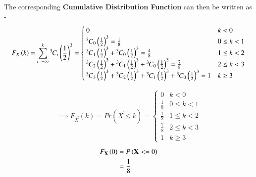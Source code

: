 \documentclass[journal]{IEEEtran}
\begin{document}
The corresponding \textbf{Cumulative Distribution Function} can then be written as - 
\begin{align}
  F_{X}\left(k\right) = \sum_{i = -\infty}^k{{}^{3}\mkern-1muC_{i}}\left(\frac{1}{2}\right)^3 = \begin{cases}
    0 & k < 0\\
    {{}^{3}\mkern-1muC_{0}}\left(\frac{1}{2}\right)^3 = \frac{1}{8} & 0 \le k < 1\\
    {{}^{3}\mkern-1muC_{1}}\left(\frac{1}{2}\right)^3 + {{}^{3}\mkern-1muC_{0}}\left(\frac{1}{2}\right)^3 = \frac{4}{8}& 1 \le k < 2\\
    {{}^{3}\mkern-1muC_{2}}\left(\frac{1}{2}\right)^3 + {{}^{3}\mkern-1muC_{1}}\left(\frac{1}{2}\right)^3 + {{}^{3}\mkern-1muC_{0}}\left(\frac{1}{2}\right)^3 = \frac{7}{8} & 2 \le k < 3\\
    {{}^{3}\mkern-1muC_{3}}\left(\frac{1}{2}\right)^3 + {{}^{3}\mkern-1muC_{2}}\left(\frac{1}{2}\right)^3 + {{}^{3}\mkern-1muC_{1}}\left(\frac{1}{2}\right)^3 + {{}^{3}\mkern-1muC_{0}}\left(\frac{1}{2}\right)^3= 1 & k \geq 3\\
  \end{cases}
\end{align}


\begin{align}
\implies F_{\vec{X}}(k) = Pr(\vec{X} \leq k) =
\begin{cases}
    0 & k < 0 \\
    \frac{1}{8} & 0 \leq k < 1 \\
    \frac{1}{2} & 1 \leq k < 2 \\
    \frac{7}{8} & 2 \leq k < 3 \\
    1 & k \geq 3
\end{cases}
\end{align}
\begin{align}
	F_{\mathbf{X}} \left(0\right) &= P \left( \mathbf{X} <= 0 \right) \\
	                     &= \frac{1}{8}
\end{align} \\
\end{document}
